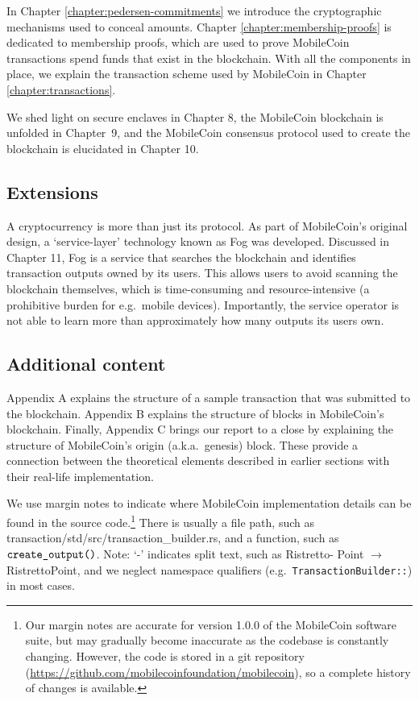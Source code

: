 In Chapter \ref{chapter:pedersen-commitments} we introduce the cryptographic mechanisms used to conceal amounts. Chapter \ref{chapter:membership-proofs} is dedicated to membership proofs, which are used to prove MobileCoin transactions spend funds that exist in the blockchain. With all the components in place, we explain the transaction scheme used by MobileCoin in Chapter \ref{chapter:transactions}.

We shed light on secure enclaves in Chapter 8, the MobileCoin blockchain is unfolded in Chapter~9, and the MobileCoin consensus protocol used to create the blockchain is elucidated in Chapter 10.%


\subsection{Extensions}

A cryptocurrency is more than just its protocol. As part of MobileCoin's original design, a `service-layer' technology known as Fog was developed. Discussed in Chapter 11, Fog is a service that searches the blockchain and identifies transaction outputs owned by its users. This allows users to avoid scanning the blockchain themselves, which is time-consuming and resource-intensive (a prohibitive burden for e.g.\ mobile devices). Importantly, the service operator is not able to learn more than approximately how many outputs its users own.%


\subsection{Additional content}
Appendix A explains the structure of a sample transaction that was submitted to the blockchain. Appendix B explains the structure of blocks in MobileCoin's blockchain. Finally, Appendix C brings our report to a close by explaining the structure of MobileCoin's origin (a.k.a.\ genesis) block. These provide a connection between the theoretical elements described in earlier sections with their real-life implementation.

We use margin notes to indicate where MobileCoin implementation details can be found in the source code.\footnote{Our margin notes are accurate for version 1.0.0 of the MobileCoin software suite, but may gradually become inaccurate as the codebase is constantly changing. However, the code is stored in a git repository (\url{https://github.com/mobilecoinfoundation/mobilecoin}), so a complete history of changes is available.} There is usually a file path, such as transaction/std/src/transaction\_builder.rs, and a function, such as \(\textrm{{\tt create\_output()}}\). Note: `-' indicates split text, such as Ristretto- Point $\rightarrow$ RistrettoPoint, and we neglect namespace qualifiers (e.g.\ {\tt TransactionBuilder::}) in most cases.

